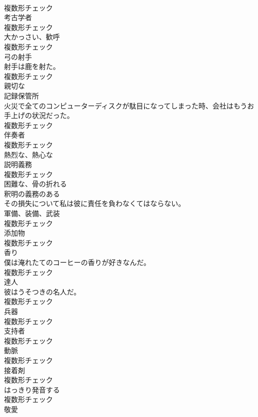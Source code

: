 \documentclass[8pt]{extreport}
\begin{document}
\begin{CJK}{UTF8}{min}
\\	複数形チェック
\\	[名詞]	考古学者	
\\	複数形チェック
\\	[名詞]	大かっさい、歓呼	
\\	複数形チェック
\\	[名詞]	弓の射手	
\\	射手は鹿を射た。	
\\	複数形チェック
\\	[形容詞]	親切な	
\\	[名詞]	記録保管所	
\\	火災で全てのコンピューターディスクが駄目になってしまった時、会社はもうお手上げの状況だった。	
\\	複数形チェック
\\	[名詞]	伴奏者	
\\	複数形チェック
\\	[形容詞]	熱烈な、熱心な	
\\	[名詞]	説明義務	
\\	複数形チェック
\\	[形容詞]	困難な、骨の折れる	
\\	[形容詞]	釈明の義務のある	
\\	その損失について私は彼に責任を負わなくてはならない。	
\\	[名詞]	軍備、装備、武装	
\\	複数形チェック
\\	[名詞]	添加物	
\\	複数形チェック
\\	[名詞]	香り	
\\	僕は淹れたてのコーヒーの香りが好きなんだ。	
\\	複数形チェック
\\	[名詞]	達人	
\\	彼はうそつきの名人だ。	
\\	複数形チェック
\\	[名詞]	兵器	
\\	複数形チェック
\\	[名詞]	支持者	
\\	複数形チェック
\\	[名詞]	動脈	
\\	複数形チェック
\\	[名詞]	接着剤	
\\	複数形チェック
\\	[名詞]	はっきり発音する	
\\	複数形チェック
\\	[名詞]	敬愛	

\end{CJK}
\end{document}
